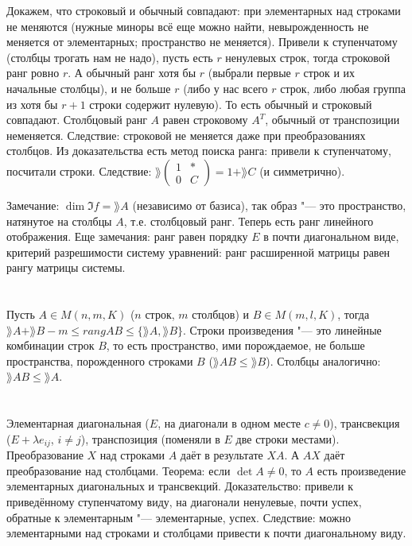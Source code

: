 Докажем, что строковый и обычный совпадают: при элементарных над строками не меняются (нужные миноры всё еще можно найти, невырожденность не меняется от элементарных; пространство не меняется).
Привели к ступенчатому (столбцы трогать нам не надо), пусть есть $r$ ненулевых строк, тогда строковой ранг ровно $r$.
А обычный ранг хотя бы $r$ (выбрали первые $r$ строк и их начальные столбцы), и не больше $r$ (либо у нас всего $r$ строк, либо любая группа из хотя бы $r+1$ строки содержит нулевую).
То есть обычный и строковый совпадают.
Столбцовый ранг $A$ равен строковому $A^T$, обычный от транспозиции неменяется.
Следствие: строковой не меняется даже при преобразованиях столбцов.
Из доказательства есть метод поиска ранга: привели к ступенчатому, посчитали строки.
Следствие: $\rang \begin{pmatrix}1&*\\0&C\end{pmatrix} = 1 + \rang C$ (и симметрично).

Замечание: $\dim \Im f = \rang A$ (независимо от базиса), так образ "--- это пространство, натянутое на столбцы $A$, т.е. столбцовый ранг.
Теперь есть ранг линейного отображения.
Еще замечания: ранг равен порядку $E$ в почти диагональном виде, критерий разрешимости систему уравнений: ранг расширенной матрицы равен рангу матрицы системы.

\section{} %
Пусть $A \in M(n, m, K)$ ($n$ строк, $m$ столбцов) и $B \in M(m, l, K)$, тогда
$\rang A + \rang B - m \le rang AB \le \{ \rang A, \rang B \}$.
Строки произведения "--- это линейные комбинации строк $B$, то есть пространство, ими порождаемое, не больше пространства, порожденного строками $B$ ($\rang AB \le \rang B$).
Столбцы аналогично: $\rang AB \le \rang A$.

\section{} %
Элементарная диагональная ($E$, на диагонали в одном месте $c \neq 0$),
трансвекция ($E+\lambda e_{ij}$, $i \neq j$),
транспозиция (поменяли в $E$ две строки местами).
Преобразование $X$ над строками $A$ даёт в результате $XA$.
А $AX$ даёт преобразование над столбцами.
Теорема: если $\det A \neq 0$, то $A$ есть произведение элементарных диагональных и трансвекций.
Доказательство: привели к приведённому ступенчатому виду, на диагонали ненулевые, почти успех, обратные к элементарным "--- элементарные, успех.
Следствие: можно элементарными над строками и столбцами привести к почти диагональному виду.

